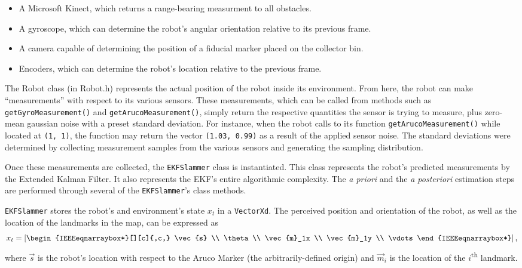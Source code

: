 \documentclass[journal]{IEEEtran}
\begin{document}
\begin{itemize}
 \item A Microsoft Kinect, which returns a range-bearing measurment to all obstacles.
 \item A gyroscope, which can determine the robot’s angular orientation relative to its previous frame.
 \item A camera capable of determining the position of a fiducial marker placed on the collector bin.
 \item Encoders, which can determine the robot’s location relative to the previous frame. 
\end{itemize}

The Robot class (in Robot.h) represents the actual position of the robot inside its environment. 
From here, the robot can make ``measurements'' with respect to its various sensors. These 
measurements, which can be called from methods such as \texttt{getGyroMeasurement()} and 
\texttt{getArucoMeasurement()}, simply return the respective quantities the sensor is trying to 
measure, plus zero-mean gaussian noise with a preset standard deviation.  For instance, when the 
robot calls to its function \texttt{getArucoMeasurement()} while located at \texttt{(1, 1)}, the 
function may return the vector \texttt{(1.03, 0.99)} as a result of the applied sensor noise. The standard deviations were determined by collecting measurement samples from the various sensors and generating the sampling distribution.

Once these measurements are collected, the \texttt{EKFSlammer} class is instantiated. This class 
represents the robot's predicted measurements by the Extended Kalman Filter. It also represents 
the EKF's entire algorithmic complexity. The \textit{a priori} and the \textit{a posteriori} estimation steps are 
performed through several of the \texttt{EKFSlammer}'s class methods. 

\texttt{EKFSlammer} stores the robot's and environment's state $x_t$ in a \texttt{VectorXd}. The
perceived position and orientation of the robot, as well as the location of the landmarks in the map, 
can be expressed as 
\begin{equation*}
 x_t = \left[\begin{IEEEeqnarraybox*}[][c]{,c,}
        \vec{s} \\
        \theta \\
        \vec{m}_1x \\
        \vec{m}_1y \\
        \vdots
        \end{IEEEeqnarraybox*}\right],
\end{equation*}
where $\vec{s}$ is the robot's location with respect to the Aruco Marker (the arbitrarily-defined
origin) and $\vec{m}_i$ is the location of the $i$\textsuperscript{th} landmark.
\end{document}
